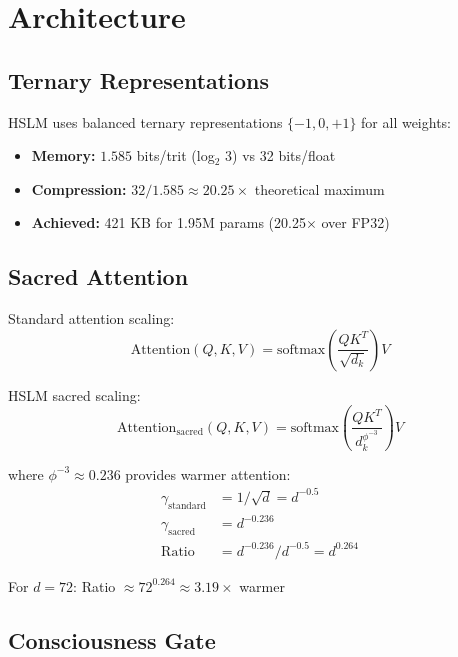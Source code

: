 \documentclass{article}
\newcommand{\phiinvthree}{\phi^{-3}}
\begin{document}
\section{Architecture}

\subsection{Ternary Representations}

HSLM uses balanced ternary representations $\{-1, 0, +1\}$ for all weights:
\begin{itemize}
    \item \textbf{Memory:} $1.585$ bits/trit (log$_2$ 3) vs 32 bits/float
    \item \textbf{Compression:} $32 / 1.585 \approx 20.25\times$ theoretical maximum
    \item \textbf{Achieved:} 421 KB for 1.95M params (20.25$\times$ over FP32)
\end{itemize}

\subsection{Sacred Attention}

Standard attention scaling:
\begin{equation}
    \text{Attention}(Q, K, V) = \text{softmax}\left(\frac{QK^T}{\sqrt{d_k}}\right)V
\end{equation}

HSLM sacred scaling:
\begin{equation}
    \text{Attention}_{\text{sacred}}(Q, K, V) = \text{softmax}\left(\frac{QK^T}{d_k^{\phiinvthree}}\right)V
\end{equation}

where $\phiinvthree \approx 0.236$ provides warmer attention:
\begin{align}
    \gamma_{\text{standard}} &= 1/\sqrt{d} = d^{-0.5} \\
    \gamma_{\text{sacred}} &= d^{-0.236} \\
    \text{Ratio} &= d^{-0.236} / d^{-0.5} = d^{0.264}
\end{align}

For $d = 72$: Ratio $\approx 72^{0.264} \approx 3.19\times$ warmer

\subsection{Consciousness Gate}
\end{document}
